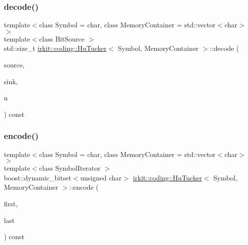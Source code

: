 \mbox{\label{classirkit_1_1coding_1_1HuTucker_a2c4e9a57c3eec1627d95e776330f67f7}} 
\subsubsection{\texorpdfstring{decode()}{decode()}\hspace{0.1cm}{\footnotesize\ttfamily [2/2]}}
{\footnotesize\ttfamily template$<$class Symbol  = char, class Memory\+Container  = std\+::vector$<$char$>$$>$ \\
template$<$class Bit\+Source $>$ \\
std\+::size\+\_\+t \mbox{\hyperlink{classirkit_1_1coding_1_1HuTucker}{irkit\+::coding\+::\+Hu\+Tucker}}$<$ Symbol, Memory\+Container $>$\+::decode (\begin{DoxyParamCaption}\item[{Bit\+Source \&}]{source,  }\item[{std\+::ostream \&}]{sink,  }\item[{std\+::size\+\_\+t}]{n }\end{DoxyParamCaption}) const\hspace{0.3cm}{\ttfamily [inline]}}

\mbox{\label{classirkit_1_1coding_1_1HuTucker_adde9798abd87416b4f2484126833dae5}} 
\subsubsection{\texorpdfstring{encode()}{encode()}\hspace{0.1cm}{\footnotesize\ttfamily [1/3]}}
{\footnotesize\ttfamily template$<$class Symbol  = char, class Memory\+Container  = std\+::vector$<$char$>$$>$ \\
template$<$class Symbol\+Iterator $>$ \\
boost\+::dynamic\+\_\+bitset$<$unsigned char$>$ \mbox{\hyperlink{classirkit_1_1coding_1_1HuTucker}{irkit\+::coding\+::\+Hu\+Tucker}}$<$ Symbol, Memory\+Container $>$\+::encode (\begin{DoxyParamCaption}\item[{Symbol\+Iterator}]{first,  }\item[{Symbol\+Iterator}]{last }\end{DoxyParamCaption}) const\hspace{0.3cm}{\ttfamily [inline]}}

